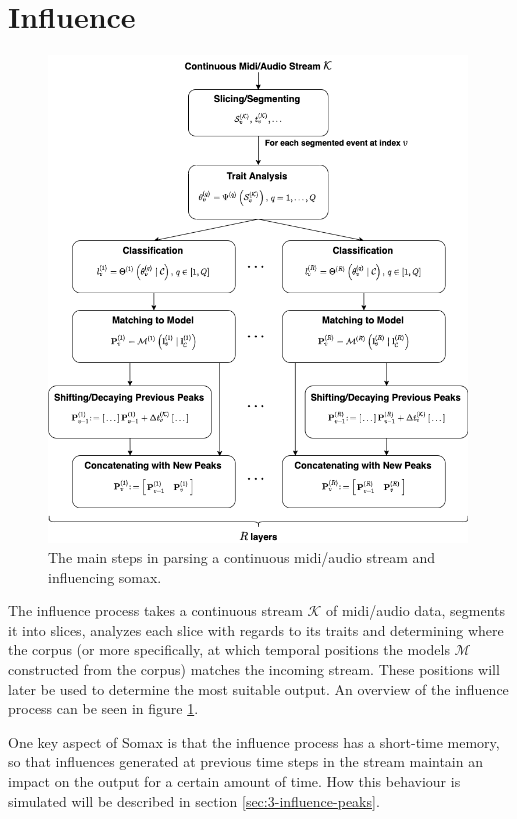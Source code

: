 \section{Influence}\label{sec:3-influence}
 \begin{figure}[h!]
    \centering        
 	\includegraphics[width=0.99\textwidth]{figures/3-somax-influence.png}
    \caption{The main steps in parsing a continuous midi/audio stream and influencing somax.}
    \label{fig:3-somax-influence}
\end{figure}

The influence process takes a continuous stream $\mathcal K$ of midi/audio data, segments it into slices, analyzes each slice with regards to its traits and determining where the corpus (or more specifically, at which temporal positions the models $\mathcal M$ constructed from the corpus) matches the incoming stream. These positions will later be used to determine the most suitable output. An overview of the influence process can be seen in figure \ref{fig:3-somax-influence}.

One key aspect of Somax is that the influence process has a short-time memory, so that influences generated at previous time steps in the stream maintain an impact on the output for a certain amount of time. How this behaviour is simulated will be described in section \ref{sec:3-influence-peaks}.



